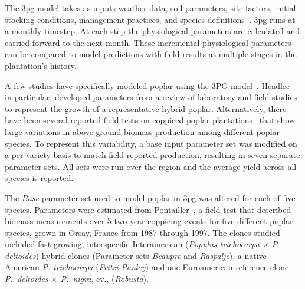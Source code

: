 \documentclass[preprint,review,12pt]{elsarticle}
\begin{document}
The \ac{3pg} model takes as inputs weather data, soil parameters, site
factors, initial stocking conditions, management practices, and
species
definitions~\cite{landsberg2010physiological,Landsberg1997,Sands2004}.
\ac{3pg} runs at a monthly timestep. At each step the physiological
parameters are calculated and carried forward to the next month.
These incremental physiological parameters
can be compared to model predictions with field results at multiple
stages in the plantation's history.

A few studies have specifically modeled poplar using the 3PG
model~\cite{Amichev2010,Headlee2012,Zalesny2012}. Headlee~\cite{Headlee2012}
in particular, developed parameters from a review of laboratory and
field studies to represent the growth of a representative hybrid
poplar.  Alternatively, there have been several reported field tests
on coppiced poplar
plantations~\cite{Proe2002,Proe1999,Pontailler1999,Afas2008a} that
show large variations in above ground biomass production among
different poplar species.  To represent this variability, a base input
parameter set was modified on a per variety basis to match field
reported production, resulting in seven separate parameter sets.  All
sets were run over the region and the average yield across all
species is reported.

The \emph{Base} parameter set used to model poplar in \ac{3pg} was
altered for each of five species. Parameters were estimated from
Pontailler~\cite{Pontailler1999,pontailler97-volume-index,Ceulemans1993},
a field test that described biomass measurements over 5 two year
coppicing events for five different poplar species, grown in Orsay,
France from 1987 through 1997. The clones studied included fast
growing, interspecific Interamerican (\textit{Populus trichocarpa
  $\times$ P deltoides}) hybrid clones (Parameter sets \emph{Beaupre}
and \emph{Raspalje}), a native American \textit{P. trichocarpa}
(\emph{Fritzi Pauley}) and one Euroamerican reference clone
\textit{P.~deltoides $\times$ P.~nigra}, cv., (\emph{Robusta}).
\end{document}
